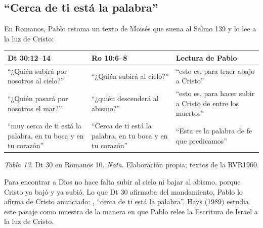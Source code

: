 
\subsection{“Cerca de ti está la palabra”}

En Romanos, Pablo retoma un texto de Moisés que suena al Salmo 139 y lo lee a la luz de Cristo:

\begin{center}\small\renewcommand{\arraystretch}{1.22}
\begin{tabular}{@{}L{4.6cm}L{4.6cm}L{4.8cm}@{}}
\toprule
\textbf{Dt 30:12--14} & \textbf{Ro 10:6--8} & \textbf{Lectura de Pablo} \\ \midrule
``¿Quién subirá por nosotros al cielo?'' & ``¿Quién subirá al cielo?'' & ``esto es, para traer abajo a Cristo'' \\
``¿Quién pasará por nosotros el mar?'' & ``¿quién descenderá al abismo?'' & ``esto es, para hacer subir a Cristo de entre los muertos'' \\
``muy cerca de ti está la palabra, en tu boca y en tu corazón'' & ``Cerca de ti está la palabra, en tu boca y en tu corazón'' & ``Esta es la palabra de fe que predicamos'' \\
\bottomrule
\end{tabular}\par
{\footnotesize\color{gris}\textit{Tabla 13.} Dt 30 en Romanos 10. \textit{Nota.} Elaboración propia; textos de la RVR1960.}
\end{center}

Para encontrar a Dios no hace falta subir al cielo ni bajar al abismo, porque Cristo ya bajó y ya subió. Lo que Dt 30 afirmaba del mandamiento, Pablo lo afirma de Cristo anunciado: , ``cerca de ti está la palabra''. Hays (1989) estudia este pasaje como muestra de la manera en que Pablo relee la Escritura de Israel a la luz de Cristo.


